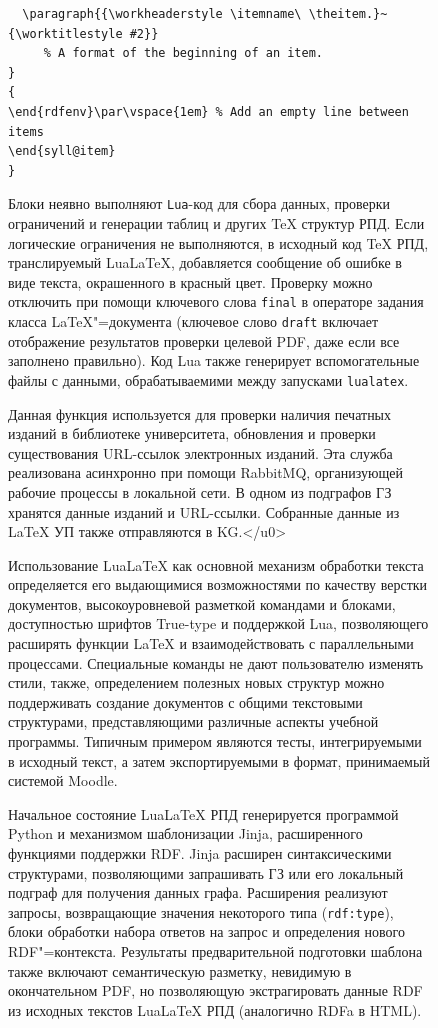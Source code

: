 \documentclass[ 

]{aiitart}
\providecommand{\LuaLaTeX}{Lua\LaTeX}
\begin{document}
\begin{figure}
\begin{verbatim}
  \paragraph{{\workheaderstyle \itemname\ \theitem.}~{\worktitlestyle #2}}
     % A format of the beginning of an item.
}
{
\end{rdfenv}\par\vspace{1em} % Add an empty line between items
\end{syll@item}
}
\end{verbatim}




Блоки неявно выполняют \verb|Lua|-код для сбора данных, проверки ограничений и генерации таблиц и других \TeX{} структур РПД. Если логические ограничения не выполняются, в исходный код \TeX{} РПД, транслируемый \LuaLaTeX{}, добавляется сообщение об ошибке в виде текста, окрашенного в красный цвет. Проверку можно отключить при помощи ключевого слова \verb|final| в операторе задания класса \LaTeX"=документа  (ключевое слово \verb|draft| включает отображение результатов проверки целевой PDF, даже если все заполнено правильно). Код Lua также генерирует вспомогательные файлы с данными, обрабатываемими между запусками \verb|lualatex|. 

Данная функция используется для проверки наличия печатных изданий в библиотеке университета, обновления и проверки существования URL-ссылок электронных изданий. Эта служба реализована асинхронно при помощи RabbitMQ, организующей рабочие процессы в локальной сети. В одном из подграфов ГЗ хранятся данные изданий и URL-ссылки. Собранные данные из \LaTeX{} УП также отправляются в KG.</u0> 

Использование \LuaLaTeX{} как основной механизм обработки текста определяется его выдающимися возможностями по качеству верстки документов, высокоуровневой разметкой командами и блоками, доступностью шрифтов True-type и поддержкой Lua, позволяющего расширять функции \LaTeX{} и взаимодействовать с параллельными процессами. Специальные команды не дают пользователю изменять стили, также, определением полезных новых структур можно поддерживать создание документов с общими текстовыми структурами, представляющими различные аспекты учебной программы. Типичным примером являются тесты, интегрируемыми в исходный текст, а затем экспортируемыми в формат, принимаемый системой Moodle. 

Начальное состояние \LuaLaTeX{} РПД генерируется программой Python и механизмом шаблонизации Jinja, расширенного функциями поддержки RDF. Jinja расширен синтаксическими структурами, позволяющими запрашивать ГЗ или его локальный подграф для получения данных графа. Расширения реализуют запросы, возвращающие значения некоторого типа (\verb|rdf:type|), блоки обработки набора ответов на запрос и определения нового RDF"=контекста. Результаты предварительной подготовки шаблона также включают семантическую разметку, невидимую в окончательном PDF, но позволяющую экстрагировать данные RDF из исходных текстов \LuaLaTeX{} РПД (аналогично RDFa в HTML). 


\end{figure}
\end{document}

